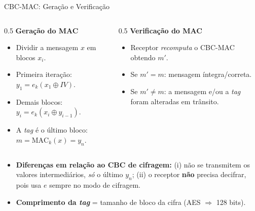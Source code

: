 \documentclass{beamer}
\begin{document}
\begin{frame}{CBC-MAC: Geração e Verificação}
    \begin{columns}[T]
        \begin{column}{0.5\textwidth}
            \textbf{Geração do MAC}
            \begin{itemize}
                \footnotesize
                \item Dividir a mensagem $x$ em blocos $x_i$.
                \item Primeira iteração: $y_1 = e_k(x_1 \oplus IV)$.
                \item Demais blocos: $y_i = e_k(x_i \oplus y_{i-1})$.
                \item A \textit{tag} é o último bloco: $m = \text{MAC}_k(x) = y_n$.
            \end{itemize}
        \end{column}
        \begin{column}{0.5\textwidth}
            \textbf{Verificação do MAC}
            \begin{itemize}
                \footnotesize
                \item Receptor \emph{recomputa} o CBC-MAC obtendo $m'$.
                \item Se $m' = m$: mensagem íntegra/correta.
                \item Se $m' \neq m$: a mensagem e/ou a \textit{tag} foram alteradas em trânsito.
            \end{itemize}
        \end{column}
    \end{columns}
    \medskip
    \begin{itemize}
        \footnotesize
        \item \textbf{Diferenças em relação ao CBC de cifragem:} (i) não se transmitem os valores intermediários, \emph{só} o último $y_n$; (ii) o receptor \textbf{não} precisa decifrar, pois usa $e$ sempre no modo de cifragem.
        \item \textbf{Comprimento da \textit{tag}} = tamanho de bloco da cifra (AES $\Rightarrow$ 128 bits).
    \end{itemize}
\end{frame}
\end{document}
